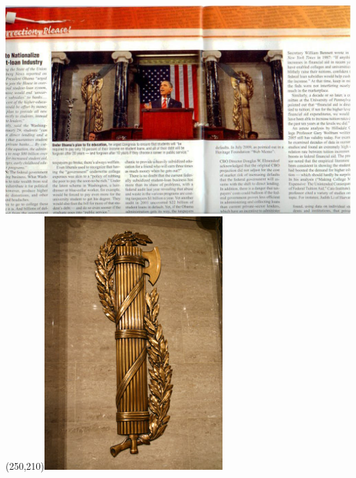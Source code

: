\begin{frame}
    \centering
    \includegraphics[width=.9\textwidth]{img/obama-fasces.jpg} \\
    \pause
    \Put(250,210){\includegraphics[height=0.55\textwidth]{img/fasces.png}}
\end{frame}

